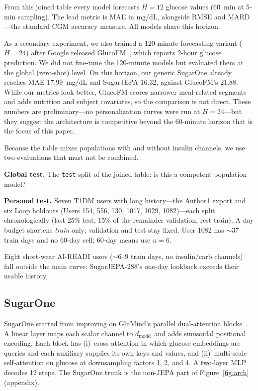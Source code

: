 \documentclass[11pt,a4paper]{article}
\begin{document}
From this joined table every model forecasts \(H=12\) glucose values
(60~min at 5-min sampling). The lead metric is MAE in mg/dL, alongside RMSE
and MARD---the standard CGM accuracy measure. All models share this
horizon.

As a secondary experiment, we also trained a 120-minute forecasting variant
(\(H=24\)) after Google released GlucoFM~\citep{li2026glucofm}, which
reports 2-hour glucose prediction. We did not fine-tune the 120-minute
models but evaluated them at the global (zero-shot) level. On this horizon,
our generic SugarOne already reaches MAE 17.99~mg/dL and SugarJEPA 16.32,
against GlucoFM's 21.88. While our metrics look better, GlucoFM scores
narrower meal-related segments and adds nutrition and subject covariates,
so the comparison is not direct. These
numbers are preliminary---no personalization curves were run at
\(H=24\)---but they suggest the architecture is competitive beyond the
60-minute horizon that is the focus of this paper.

Because the table mixes populations with and without insulin channels, we
use two evaluations that must not be combined.

\textbf{Global test.} The \texttt{test} split of the joined table: is this a
competent population model?

\textbf{Personal test.} Seven T1DM users with long history---the Author1
export and six Loop holdouts (Users 154, 556, 730, 1017, 1029,
1082)---each split chronologically (last 25\% test, 15\% of the remainder
validation, rest train). A day budget shortens \emph{train} only;
validation and test stay fixed. User 1082 has \(\sim\)37 train days and no
60-day cell; 60-day means use \(n=6\).

Eight short-wear AI-READI users (\(\sim\)6--9 train days, no insulin/carb
channels) fall outside the main curve: SugarJEPA-288's one-day lookback
exceeds their usable history.

\subsection{SugarOne}
\label{sec:sugarone}

SugarOne started from improving on GluMind's parallel dual-attention
blocks~\citep{farahmand2025glumind}. A linear layer maps each scalar channel
to \(d_{\mathrm{model}}\) and adds sinusoidal positional encoding. Each
block has (i)~cross-attention in which glucose embeddings are queries and
each auxiliary supplies its own keys and values, and (ii)~multi-scale
self-attention on glucose at downsampling factors 1, 2, and 4. A two-layer
MLP decodes 12 steps. The SugarOne trunk is the non-JEPA part of
Figure~\ref{fig:arch} (appendix).
\end{document}
